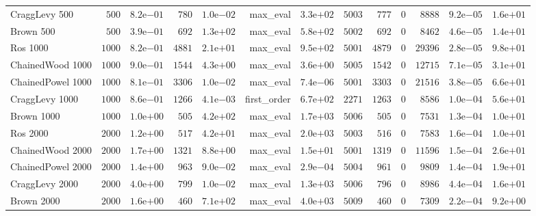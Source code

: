 \begin{longtable}[c]{lrrrrrrrrrrrr}
CraggLevy 500 & \(  500\) & \( 8.2\)e\(-01\) & \(  780\) & \( 1.0\)e\(-02\) & max\_eval & \( 3.3\)e\(+02\) & \( 5003\) & \(  777\) & \(    0\) & \( 8888\) & \( 9.2\)e\(-05\) & \( 1.6\)e\(+01\) \\
Brown 500 & \(  500\) & \( 3.9\)e\(-01\) & \(  692\) & \( 1.3\)e\(+02\) & max\_eval & \( 5.8\)e\(+02\) & \( 5002\) & \(  692\) & \(    0\) & \( 8462\) & \( 4.6\)e\(-05\) & \( 1.4\)e\(+01\) \\
Ros 1000 & \( 1000\) & \( 8.2\)e\(-01\) & \( 4881\) & \( 2.1\)e\(+01\) & max\_eval & \( 9.5\)e\(+02\) & \( 5001\) & \( 4879\) & \(    0\) & \(29396\) & \( 2.8\)e\(-05\) & \( 9.8\)e\(+01\) \\
ChainedWood 1000 & \( 1000\) & \( 9.0\)e\(-01\) & \( 1544\) & \( 4.3\)e\(+00\) & max\_eval & \( 3.6\)e\(+00\) & \( 5005\) & \( 1542\) & \(    0\) & \(12715\) & \( 7.1\)e\(-05\) & \( 3.1\)e\(+01\) \\
ChainedPowel 1000 & \( 1000\) & \( 8.1\)e\(-01\) & \( 3306\) & \( 1.0\)e\(-02\) & max\_eval & \( 7.4\)e\(-06\) & \( 5001\) & \( 3303\) & \(    0\) & \(21516\) & \( 3.8\)e\(-05\) & \( 6.6\)e\(+01\) \\
CraggLevy 1000 & \( 1000\) & \( 8.6\)e\(-01\) & \( 1266\) & \( 4.1\)e\(-03\) & first\_order & \( 6.7\)e\(+02\) & \( 2271\) & \( 1263\) & \(    0\) & \( 8586\) & \( 1.0\)e\(-04\) & \( 5.6\)e\(+01\) \\
Brown 1000 & \( 1000\) & \( 1.0\)e\(+00\) & \(  505\) & \( 4.2\)e\(+02\) & max\_eval & \( 1.7\)e\(+03\) & \( 5006\) & \(  505\) & \(    0\) & \( 7531\) & \( 1.3\)e\(-04\) & \( 1.0\)e\(+01\) \\
Ros 2000 & \( 2000\) & \( 1.2\)e\(+00\) & \(  517\) & \( 4.2\)e\(+01\) & max\_eval & \( 2.0\)e\(+03\) & \( 5003\) & \(  516\) & \(    0\) & \( 7583\) & \( 1.6\)e\(-04\) & \( 1.0\)e\(+01\) \\
ChainedWood 2000 & \( 2000\) & \( 1.7\)e\(+00\) & \( 1321\) & \( 8.8\)e\(+00\) & max\_eval & \( 1.5\)e\(+01\) & \( 5001\) & \( 1319\) & \(    0\) & \(11596\) & \( 1.5\)e\(-04\) & \( 2.6\)e\(+01\) \\
ChainedPowel 2000 & \( 2000\) & \( 1.4\)e\(+00\) & \(  963\) & \( 9.0\)e\(-02\) & max\_eval & \( 2.9\)e\(-04\) & \( 5004\) & \(  961\) & \(    0\) & \( 9809\) & \( 1.4\)e\(-04\) & \( 1.9\)e\(+01\) \\
CraggLevy 2000 & \( 2000\) & \( 4.0\)e\(+00\) & \(  799\) & \( 1.0\)e\(-02\) & max\_eval & \( 1.3\)e\(+03\) & \( 5006\) & \(  796\) & \(    0\) & \( 8986\) & \( 4.4\)e\(-04\) & \( 1.6\)e\(+01\) \\
Brown 2000 & \( 2000\) & \( 1.6\)e\(+00\) & \(  460\) & \( 7.1\)e\(+02\) & max\_eval & \( 4.0\)e\(+03\) & \( 5009\) & \(  460\) & \(    0\) & \( 7309\) & \( 2.2\)e\(-04\) & \( 9.2\)e\(+00\) \\

\end{longtable}
